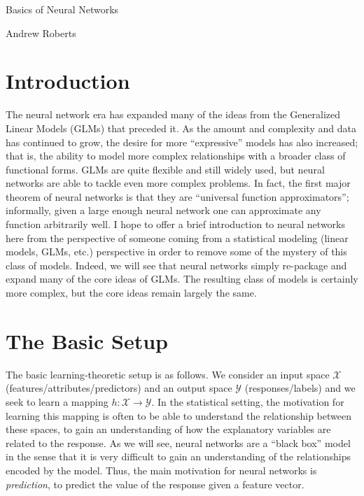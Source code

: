 \documentclass[12pt]{article}
\begin{document}
\begin{center}
\Large
Basics of Neural Networks 
\end{center}

\begin{flushright}
Andrew Roberts
\end{flushright} 

\section{Introduction}
The neural network era has expanded many of the ideas from the Generalized Linear Models (GLMs) that preceded it. As the amount and complexity and data has continued 
to grow, the desire for more ``expressive'' models has also increased; that is, the ability to model more complex relationships with a broader class of functional forms. GLMs are 
quite flexible and still widely used, but neural networks are able to tackle even more complex problems. In fact, the first major theorem of neural networks is that they are 
``universal function approximators''; informally, given a large enough neural network one can approximate any function arbitrarily well. I hope to offer a brief introduction to neural 
networks here from the perspective of someone coming from a statistical modeling (linear models, GLMs, etc.) perspective in order to remove some of the mystery of this class 
of models. Indeed, we will see that neural networks simply re-package and expand many of the core ideas of GLMs. The resulting class of models is certainly more complex, but the 
core ideas remain largely the same. 

\section{The Basic Setup}
The basic learning-theoretic setup is as follows. We consider an input space $\mathcal{X}$ (features/attributes/predictors) and an output space $\mathcal{Y}$ (responses/labels)
and we seek to learn a mapping $h: \mathcal{X} \to \mathcal{Y}$. In the statistical setting, the motivation for learning this mapping is often to be able to understand the relationship
between these spaces, to gain an understanding of how the explanatory variables are related to the response. As we will see, neural networks are a ``black box'' model in the sense 
that it is very difficult to gain an understanding of the relationships encoded by the model. Thus, the main motivation for neural networks is \textit{prediction}, to predict the value of the 
response given a feature vector. 
\end{document}
